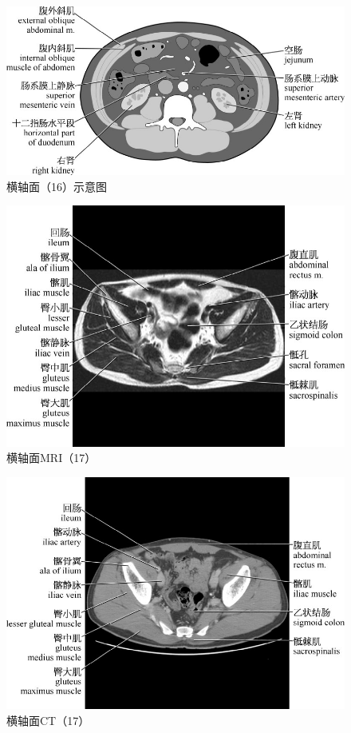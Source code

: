\begin{figure}[!htbp]
 \centering
 \includegraphics{./images/Image00049.jpg}
 \captionsetup{justification=centering}
 \caption{横轴面（16）示意图}
  \end{figure} 
 \FloatBarrier

\begin{figure}[!htbp]
 \centering
 \includegraphics{./images/Image00050.jpg}
 \captionsetup{justification=centering}
 \caption{横轴面MRI（17）}
  \end{figure} 
 \FloatBarrier

\begin{figure}[!htbp]
 \centering
 \includegraphics{./images/Image00051.jpg}
 \captionsetup{justification=centering}
 \caption{横轴面CT（17）}
  \end{figure} 
 \FloatBarrier

